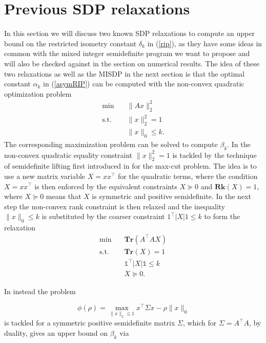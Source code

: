 \documentclass{elsarticle}
\newcommand{\T}{^{\top}}
\newcommand{\ones}{\mathds{1}}
\begin{document}
\section{Previous SDP relaxations}

In this section we will discuss two known SDP relaxations to compute an upper bound on the restricted isometry constant $\delta_k$ in (\ref{rip}), as they have some ideas in common with the mixed integer semidefinite program we want to 
propose and will also be checked against in the section on numerical results. The idea of these two relaxations as well as the MISDP in the next section is that the optimal constant $\alpha_k$ in (\ref{asymRIP}) can be computed
with the non-convex quadratic optimization problem
\begin{align}\label{QP}
 \text{min} \quad & \|Ax\|_2^2 \nonumber \\
 \text{s.t.} \quad & \|x\|_2^2 = 1 \tag{QP} \\
 & \|x\|_0 \leq k. \nonumber
\end{align}
The corresponding maximization problem can be solved to compute $\beta_k$. In \cite{Asp07} the non-convex quadratic equality constraint $\|x\|_2^2 = 1$ is tackled by the technique of semidefinite lifting first introduced in \cite{GW95} 
for the max-cut problem. The idea is to use a new matrix variable $X=xx\T$ for the quadratic terms, where the condition $X=xx\T$ is then enforced by the equivalent constraints $X \succeq 0$ and $\textbf{Rk}(X) = 1$, where 
$X \succeq 0$ means that $X$ is symmetric and positive semidefinite. In the next step the non-convex rank constraint is then relaxed and the inequality $\|x\|_0 \leq k$ is substituted by the coarser constraint $1\T|X|1 \leq k$ to form
the relaxation
\begin{align}\label{Asp07}
 \text{min} \quad & \textbf{Tr}(A\T A X) \nonumber \\
 \text{s.t.} \quad & \textbf{Tr}(X) = 1 \nonumber \\
 & \ones\T|X|\ones \leq k \tag{Asp07} \\
 & X \succeq 0. \nonumber
\end{align}

In \cite{Asp08} instead the problem

\begin{equation}\label{phi}
 \phi(\rho) = \max_{\|x\|_2 \leq 1} x\T \Sigma x - \rho \|x\|_0
\end{equation}
is tackled for a symmetric positive semidefinite matrix $\Sigma$, which for
$\Sigma = A\T A$, by duality, gives an upper bound on $\beta_k$ via 
\end{document}
